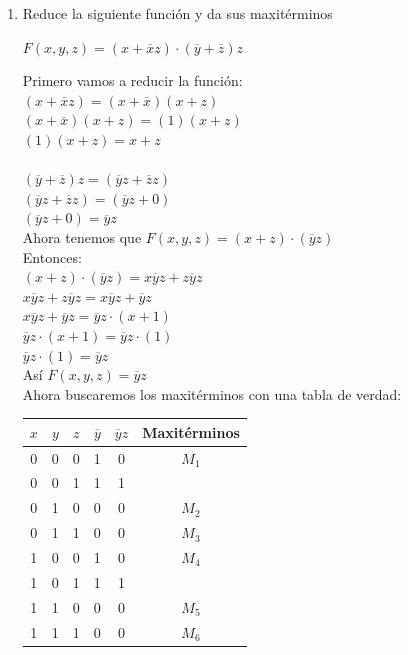 \documentclass[a4paper,12pt]{article}
\begin{document}
\begin{enumerate}[label=\textcolor{teal}{\textbf{\arabic*.}}]
    \item Reduce la siguiente función y da sus maxitérminos
        \begin{center}
            $F(x,y,z) = (x + \overline{x} z) \cdot (\overline{y} + \overline{z}) z$
        \end{center}
        Primero vamos a reducir la función:\\
        $(x + \overline{x} z)=(x+\overline{x})(x+z)$\\
        $(x+\overline{x})(x+z)=(1)(x+z)$\\
        $(1)(x+z)=x+z$\\
        \\
        $(\overline{y} + \overline{z}) z= (\overline{y}z + \overline{z}z)$\\
        $(\overline{y}z + \overline{z}z)=(\overline{y}z +0)$\\
        $(\overline{y}z +0) = \overline{y}z$\\

        Ahora tenemos que $F(x,y,z) = (x+z) \cdot (\overline{y}z)$\\
        Entonces:\\
        $(x+z) \cdot (\overline{y}z) = x\overline{y}z +z\overline{y}z$\\
        $x\overline{y}z +z\overline{y}z = x\overline{y}z +\overline{y}z$\\
        $x\overline{y}z +\overline{y}z = \overline{y}z \cdot (x+1)$\\
        $\overline{y}z \cdot (x+1) = \overline{y}z \cdot (1)$\\
        $\overline{y}z \cdot (1) = \overline{y}z$\\
        Así $F(x,y,z) = \overline{y}z$\\
        Ahora buscaremos los maxitérminos con una tabla de verdad:\\
        \begin{center}
            \begin{tabular}{|c|c|c|c|c|c|}
                \hline
                $x$ & $y$ & $z$ & $\overline{y}$ & $\overline{y}z$ & Maxitérminos\\ \hline
                0 & 0 & 0 & 1 & 0 & $M_{1}$\\ \hline
                0 & 0 & 1 & 1 & 1 & \\ \hline
                0 & 1 & 0 & 0 & 0 & $M_{2}$\\ \hline
                0 & 1 & 1 & 0 & 0 & $M_{3}$\\ \hline
                1 & 0 & 0 & 1 & 0 & $M_{4}$\\ \hline
                1 & 0 & 1 & 1 & 1 & \\ \hline
                1 & 1 & 0 & 0 & 0 & $M_{5}$\\ \hline
                1 & 1 & 1 & 0 & 0 & $M_{6}$\\ \hline
            \end{tabular}
        \end{center}


\end{enumerate}
\end{document}
